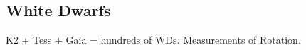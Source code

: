 {\color{red} \subsection{White Dwarfs}}
K2 + Tess + Gaia = hundreds of WDs. Measurements of Rotation.